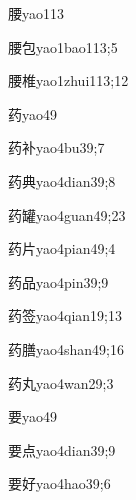 \begin{verbete}{腰}{yao1}{13}
\end{verbete}
\begin{verbete}{腰包}{yao1bao1}{13;5}
\end{verbete}
\begin{verbete}{腰椎}{yao1zhui1}{13;12}
\end{verbete}
\begin{verbete}{药}{yao4}{9}
\end{verbete}
\begin{verbete}{药补}{yao4bu3}{9;7}
\end{verbete}
\begin{verbete}{药典}{yao4dian3}{9;8}
\end{verbete}
\begin{verbete}{药罐}{yao4guan4}{9;23}
\end{verbete}
\begin{verbete}{药片}{yao4pian4}{9;4}
\end{verbete}
\begin{verbete}{药品}{yao4pin3}{9;9}
\end{verbete}
\begin{verbete}{药签}{yao4qian1}{9;13}
\end{verbete}
\begin{verbete}{药膳}{yao4shan4}{9;16}
\end{verbete}
\begin{verbete}{药丸}{yao4wan2}{9;3}
\end{verbete}
\begin{verbete}{要}{yao4}{9}
\end{verbete}
\begin{verbete}{要点}{yao4dian3}{9;9}
\end{verbete}
\begin{verbete}{要好}{yao4hao3}{9;6}
\end{verbete}
